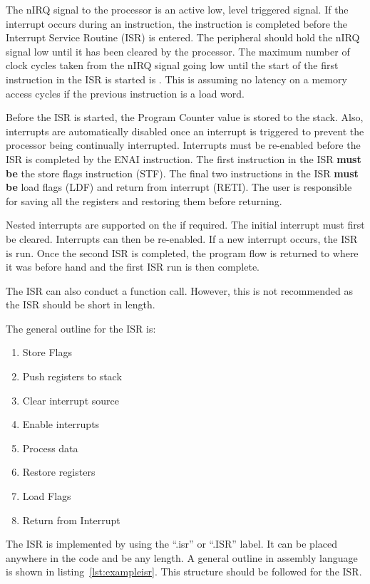 The nIRQ signal to the \samurai{} processor is an active low, level triggered signal.
If the interrupt occurs during an instruction, the instruction is completed before the Interrupt Service Routine (ISR) is entered.
The peripheral should hold the nIRQ signal low until it has been cleared by the processor.
The maximum number of clock cycles taken from the nIRQ signal going low until the start of the first instruction in the ISR is started is .
This is assuming no latency on a memory access cycles if the previous instruction is a load word. 

Before the ISR is started, the Program Counter value is stored to the stack. 
Also, interrupts are automatically disabled once an interrupt is triggered to prevent the processor being continually interrupted.
Interrupts must be re-enabled before the ISR is completed by the ENAI instruction.
The first instruction in the ISR \textbf{must be} the store flags instruction (STF). 
The final two instructions in the ISR \textbf{must be} load flags (LDF) and return from interrupt (RETI). 
The user is responsible for saving all the registers and restoring them before returning. 

Nested interrupts are supported on the \samurai{} if required. 
The initial interrupt must first be cleared. 
Interrupts can then be re-enabled. 
If a new interrupt occurs, the ISR is run. 
Once the second ISR is completed, the program flow is returned to where it was before hand and the first ISR run is then complete.

The ISR can also conduct a function call. 
However, this is not recommended as the ISR should be short in length.

The general outline for the ISR is:
\begin{enumerate}
\item Store Flags
\item Push registers to stack
\item Clear interrupt source
\item Enable interrupts
\item Process data
\item Restore registers
\item Load Flags
\item Return from Interrupt
\end{enumerate}

The ISR is implemented by using the ``.isr'' or ``.ISR'' label. 
It can be placed anywhere in the code and be any length.
A general outline in assembly language is shown in listing~\ref{lst:exampleisr}. 
This structure should be followed for the ISR.






